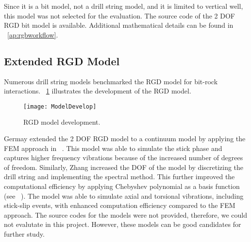 Since it is a bit model, not a drill string model, and it is limited to vertical well, this model was not selected for the evaluation. The source code of the 2 DOF RGD bit model is available.  Additional mathematical details can be found in \appendixname~\ref{ap:rgbworkflow}.

\subsection{Extended RGD Model}
Numerous drill string models benchmarked the RGD model for bit-rock interactions. \figurename~\ref{model_develop_figure} illustrates the development of the RGD model.
\begin{figure}
  \centering
  \texttt{[image: ModelDevelop]}
  \caption[RGD model development]{RGD model development.}\label{model_develop_figure}
\end{figure}
Germay extended the 2 DOF RGD model to a continuum model by applying the FEM approach in ~\cite{ref:germay2009a}. This model was able to simulate the stick phase and captures higher frequency vibrations because of the increased number of degrees of freedom. Similarly, Zhang increased the DOF of the model by discretizing the drill string and implementing the spectral method. This further improved the computational efficiency by applying Chebyshev polynomial as a basis function (see ~\cite{ref:zhang2020a}). The model was able to simulate axial and torsional vibrations, including stick-slip events, with enhanced computation efficiency compared to the FEM approach. The source codes for the models were not provided, therefore, we could not evalutate in this project. However, these models can be good candidates for further study. 